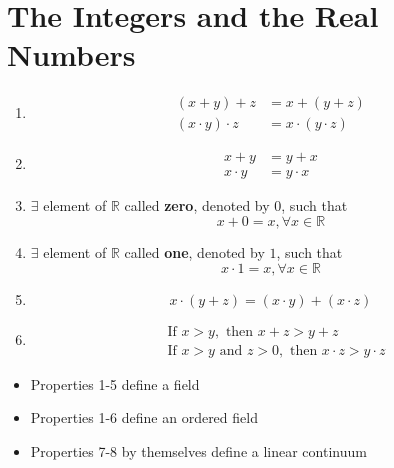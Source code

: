 \section{The Integers and the Real Numbers}

\begin{enumerate}
  \item
  \begin{align*}
  (x+y) + z &= x + (y + z)\\
  (x\cdot y) \cdot z &= x \cdot (y \cdot z)
  \end{align*}

  \item \begin{align*}
    x + y &= y + x\\
    x \cdot y &= y \cdot x
  \end{align*}

  \item $\exists$ element of $\mathbb{R}$ called \textbf{zero}, denoted by $0$, such that
  \begin{equation*}
    x + 0 = x, \forall x \in \mathbb{R}
  \end{equation*}

  \item $\exists$ element of $\mathbb{R}$ called \textbf{one}, denoted by $1$, such that
  \begin{equation*}
    x \cdot 1 = x, \forall x \in \mathbb{R}
  \end{equation*}

  \item \begin{equation*}
    x \cdot (y + z) = (x \cdot y) + (x \cdot z)
  \end{equation*}

  \item \begin{align*}
    &\text{If } x>y, \text{ then } x + z > y + z\\
    &\text{If } x>y \text{ and } z > 0, \text{ then } x \cdot z > y \cdot z
  \end{align*}
\end{enumerate}

\begin{itemize}
  \item Properties 1-5 define a field
  \item Properties 1-6 define an ordered field
  \item Properties 7-8 by themselves define a linear continuum
\end{itemize}

